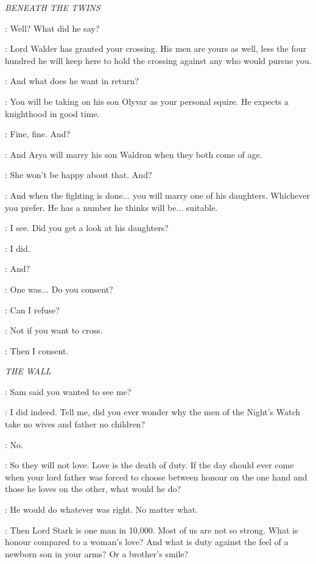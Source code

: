 \scene

\textit{BENEATH THE TWINS} 


\ROBB: Well? What did he say? 

\CATELYN: Lord Walder has granted your crossing. His men are yours as well, less the four hundred he will keep here to hold the crossing against any who would pursue you. 

\ROBB: And what does he want in return? 

\CATELYN: You will be taking on his son Olyvar as your personal squire. He expects a knighthood in good time. 

\ROBB: Fine, fine. And? 

\CATELYN: And Arya will marry his son Waldron when they both come of age. 

\ROBB: She won't be happy about that. And? 

\CATELYN: And when the fighting is done$\ldots$ you will marry one of his daughters. Whichever you prefer. He has a number he thinks will be$\ldots$ suitable. 

\ROBB: I see. Did you get a look at his daughters? 

\CATELYN: I did. 

\ROBB: And? 

\CATELYN: One was$\ldots$ Do you consent? 

\ROBB: Can I refuse? 

\CATELYN: Not if you want to cross. 

\ROBB: Then I consent. 


\scene

\textit{THE WALL} 


\JON: Sam said you wanted to see me? 

\AEMON: I did indeed.  Tell me, did you ever wonder why the men of the Night's Watch take no wives and father no children? 

\JON: No. 

\AEMON: So they will not love. Love is the death of duty. If the day should ever come when your lord father was forced to choose between honour on the one hand and those he loves on the other, what would he do? 

\JON: He would do whatever was right. No matter what. 

\AEMON: Then Lord Stark is one man in 10,000. Most of us are not so strong. What is honour compared to a woman's love? And what is duty against the feel of a newborn son in your arms? Or a brother's smile? 

